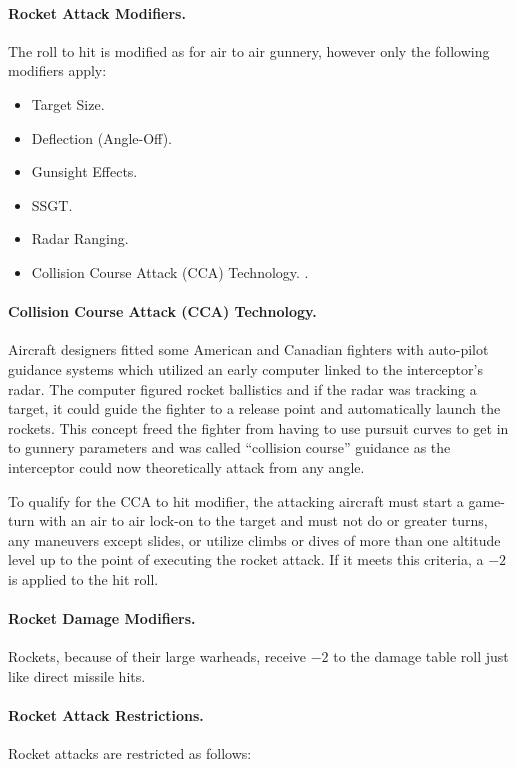 \paragraph{Rocket Attack Modifiers.} The roll to hit is modified as for air to air gunnery, however only the following modifiers apply:

\begin{itemize}
    \item Target Size.
    \item Deflection (Angle-Off).
    \item Gunsight Effects.
    \item SSGT.
    \item Radar Ranging.
    \item Collision Course Attack (CCA) Technology.
    .
\end{itemize}

\paragraph{Collision Course Attack (CCA) Technology.} Aircraft designers fitted some American and Canadian fighters with auto-pilot guidance systems which utilized an early computer linked to the interceptor's radar. The computer figured rocket ballistics and if the radar was tracking a target, it could guide the fighter to a release point and automatically launch the rockets. This concept freed the fighter from having to use pursuit curves to get in to gunnery parameters and was called “collision course” guidance as the interceptor could now theoretically attack from any angle.

To qualify for the CCA to hit modifier, the attacking aircraft must start a game-turn with an air to air lock-on to the target and must not do  or greater turns, any maneuvers except slides, or utilize climbs or dives of more than one altitude level up to the point of executing the rocket attack. If it meets this criteria, a $-2$ is applied to the hit roll.

\paragraph{Rocket Damage Modifiers.} Rockets, because of their large warheads, receive $-2$ to the damage table roll just like direct missile hits.

\paragraph{Rocket Attack Restrictions.} Rocket attacks are restricted as follows:

